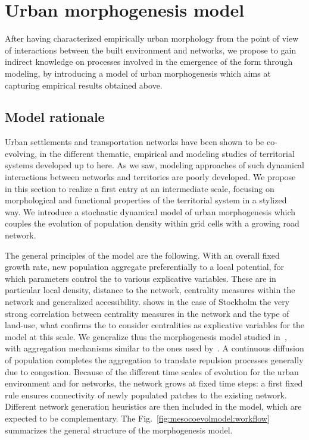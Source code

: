 \section{Urban morphogenesis model}

After having characterized empirically urban morphology from the point of view of interactions between the built environment and networks, we propose to gain indirect knowledge on processes involved in the emergence of the form through modeling, by introducing a model of urban morphogenesis which aims at capturing empirical results obtained above.

\subsection{Model rationale}



Urban settlements and transportation networks have been shown to be co-evolving, in the different thematic, empirical  and modeling studies of territorial systems developed up to here. As we saw, modeling approaches of such dynamical interactions between networks and territories are poorly developed. We propose in this section to realize a first entry at an intermediate scale, focusing on morphological and functional properties of the territorial system in a stylized way. We introduce a stochastic dynamical model of urban morphogenesis which couples the evolution of population density within grid cells with a growing road network.


The general principles of the model are the following. With an overall fixed growth rate, new population aggregate preferentially to a local potential, for which parameters control the  to various explicative variables. These are in particular local density, distance to the network, centrality measures within the network and generalized accessibility. \cite{doi:10.1080/13658816.2014.893347} shows in the case of Stockholm the very strong correlation between centrality measures in the network and the type of land-use, what confirms the  to consider centralities as explicative variables for the model at this scale. We generalize thus the morphogenesis model studied in~\cite{2017arXiv170806743R}, with aggregation mechanisms similar to the ones used by~\cite{raimbault2014hybrid}. A continuous diffusion of population completes the aggregation to translate repulsion processes generally due to congestion. Because of the different time scales of evolution for the urban environment and for networks, the network grows at fixed time steps: a first fixed rule ensures connectivity of newly populated patches to the existing network. Different network generation heuristics are then included in the model, which are expected to be complementary. The Fig.~\ref{fig:mesocoevolmodel:workflow} summarizes the general structure of the morphogenesis model.



